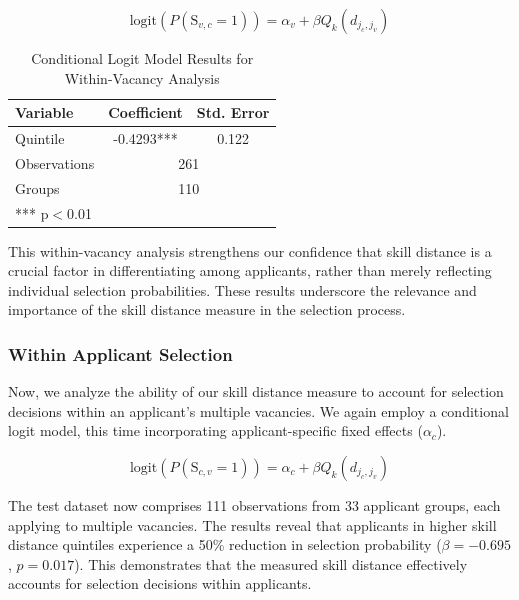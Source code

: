 \begin{equation}
\text{logit}(P(\text{S}_{v,c} = 1)) = \alpha_v + \beta Q_k(d_{j_c,j_v})
\end{equation}

\begin{table}[h]
    \centering
    \caption{Conditional Logit Model Results for Within-Vacancy Analysis}
    \renewcommand{\arraystretch}{1.2}
    \begin{tabular}{lcc}
    \hline
    \textbf{Variable} & \textbf{Coefficient} & \textbf{Std. Error} \\
    \hline
    Quintile & -0.4293*** & 0.122 \\
    \hline
    Observations & \multicolumn{2}{c}{261} \\
    Groups & \multicolumn{2}{c}{110} \\
    \hline
    \multicolumn{3}{l}{\footnotesize{*** p$<$0.01}} \\
    \end{tabular}
    \label{tab:within_vacancy}
\end{table}

This within-vacancy analysis strengthens our confidence that skill distance is a crucial factor in differentiating among applicants, rather than merely reflecting individual 
selection probabilities. These results underscore the relevance and importance of the skill distance measure in the selection process. 



\subsubsection{Within Applicant Selection}

Now, we analyze the ability of our skill distance measure to account for selection decisions within an applicant's multiple vacancies. We again employ a conditional logit model, 
this time incorporating applicant-specific fixed effects ($\alpha_c$).


\begin{equation}
\text{logit}(P(\text{S}_{c,v} = 1)) = \alpha_c + \beta Q_k(d_{j_c,j_v})
\end{equation}

The test dataset now comprises 111 observations from 33 applicant groups, each applying to multiple vacancies. The results reveal that applicants in higher skill distance 
quintiles experience a 50\% reduction in selection probability (\(\beta = -0.695\), \(p = 0.017\)). This demonstrates that the measured skill distance effectively accounts 
for selection decisions within applicants. 


